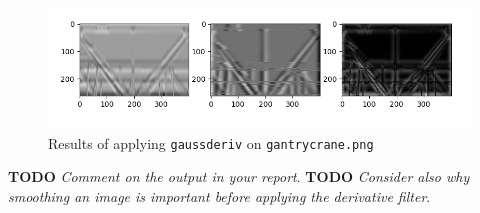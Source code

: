 \documentclass{article}
\begin{document}
\begin{figure}[ht]
    \centering
    \includegraphics[width=\textwidth]{images/Q1.e-gantrycrane-gaussderived.png}
    \cprotect\caption{Results of applying \verb|gaussderiv| on \verb|gantrycrane.png|}
    \label{fig:gaussderiv-gantrycrane.png}
\end{figure}

\noindent
{\color{red} \large \textbf{TODO}} \textit{Comment on the output in your report}.
\newline
{\color{red} \large \textbf{TODO}} \textit{Consider also why smoothing an image is important before applying the derivative filter}.
\end{document}
